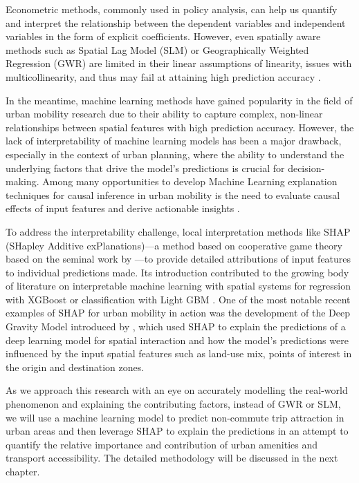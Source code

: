 Econometric methods, commonly used in policy analysis, can help us quantify and interpret the relationship between the dependent variables and independent variables in the form of explicit coefficients. However, even spatially aware methods such as Spatial Lag Model (SLM) or Geographically Weighted Regression (GWR) are limited in their linear assumptions of linearity, issues with multicollinearity, and thus may fail at attaining high prediction accuracy \citep{wheelerMulticollinearityCorrelationLocal2005}.

In the meantime, machine learning methods have gained popularity in the field of urban mobility research due to their ability to capture complex, non-linear relationships between spatial features with high prediction accuracy. However, the lack of interpretability of machine learning models has been a major drawback, especially in the context of urban planning, where the ability to understand the underlying factors that drive the model's predictions is crucial for decision-making. Among many opportunities to develop Machine Learning explanation techniques for causal inference in urban mobility is the need to evaluate causal effects of input features and derive actionable insights \citep{xinVisionPaperCausal2022}.

To address the interpretability challenge, local interpretation methods like SHAP (SHapley Additive exPlanations)---a method based on cooperative game theory based on the seminal work by \cite{lundbergUnifiedApproachInterpreting2017a}---to provide detailed attributions of input features to individual predictions made. Its introduction contributed to the growing body of literature on interpretable machine learning with spatial systems for regression with XGBoost \citep{liExtractingSpatialEffects2022} or classification with Light GBM \citep{louhichiShapleyValuesExplaining2023}. One of the most notable recent examples of SHAP for urban mobility in action was the development of the Deep Gravity Model introduced by \cite{siminiDeepGravityModel2021}, which used SHAP to explain the predictions of a deep learning model for spatial interaction and how the model's predictions were influenced by the input spatial features such as land-use mix, points of interest in the origin and destination zones. 

As we approach this research with an eye on accurately modelling the real-world phenomenon and explaining the contributing factors, instead of GWR or SLM, we will use a machine learning model to predict non-commute trip attraction in urban areas and then leverage SHAP to explain the predictions in an attempt to quantify the relative importance and contribution of urban amenities and transport accessibility. The detailed methodology will be discussed in the next chapter.


